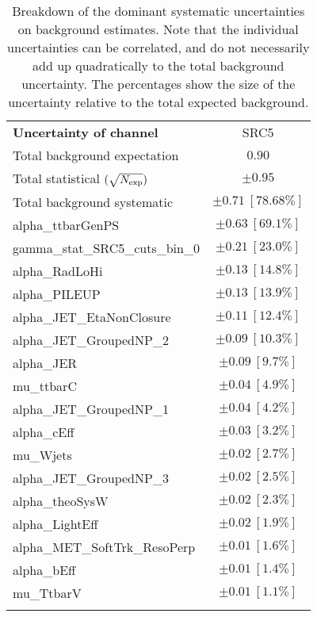 
\begin{table}
\begin{center}
\setlength{\tabcolsep}{0.0pc}
\begin{tabular*}{\textwidth}{@{\extracolsep{\fill}}lc}
\noalign{\smallskip}\hline\noalign{\smallskip}
{\bf Uncertainty of channel}                                    & SRC5            \\
\noalign{\smallskip}\hline\noalign{\smallskip}
Total background expectation             &  $0.90$       \\
\noalign{\smallskip}\hline\noalign{\smallskip}
Total statistical $(\sqrt{N_{\rm exp}})$              & $\pm 0.95$       \\
Total background systematic               & $\pm 0.71\ [78.68\%] $             \\
\noalign{\smallskip}\hline\noalign{\smallskip}
\noalign{\smallskip}\hline\noalign{\smallskip}
alpha\_ttbarGenPS         & $\pm 0.63\ [69.1\%] $       \\
gamma\_stat\_SRC5\_cuts\_bin\_0         & $\pm 0.21\ [23.0\%] $       \\
alpha\_RadLoHi         & $\pm 0.13\ [14.8\%] $       \\
alpha\_PILEUP         & $\pm 0.13\ [13.9\%] $       \\
alpha\_JET\_EtaNonClosure         & $\pm 0.11\ [12.4\%] $       \\
alpha\_JET\_GroupedNP\_2         & $\pm 0.09\ [10.3\%] $       \\
alpha\_JER         & $\pm 0.09\ [9.7\%] $       \\
mu\_ttbarC         & $\pm 0.04\ [4.9\%] $       \\
alpha\_JET\_GroupedNP\_1         & $\pm 0.04\ [4.2\%] $       \\
alpha\_cEff         & $\pm 0.03\ [3.2\%] $       \\
mu\_Wjets         & $\pm 0.02\ [2.7\%] $       \\
alpha\_JET\_GroupedNP\_3         & $\pm 0.02\ [2.5\%] $       \\
alpha\_theoSysW         & $\pm 0.02\ [2.3\%] $       \\
alpha\_LightEff         & $\pm 0.02\ [1.9\%] $       \\
alpha\_MET\_SoftTrk\_ResoPerp         & $\pm 0.01\ [1.6\%] $       \\
alpha\_bEff         & $\pm 0.01\ [1.4\%] $       \\
mu\_TtbarV         & $\pm 0.01\ [1.1\%] $       \\
\noalign{\smallskip}\hline\noalign{\smallskip}
\end{tabular*}
\end{center}
\caption[Breakdown of uncertainty on background estimates]{
Breakdown of the dominant systematic uncertainties on background estimates.
Note that the individual uncertainties can be correlated, and do not necessarily add up quadratically to 
the total background uncertainty. The percentages show the size of the uncertainty relative to the total expected background.
\label{table.results.bkgestimate.uncertainties.SRC5}}
\end{table}
%
